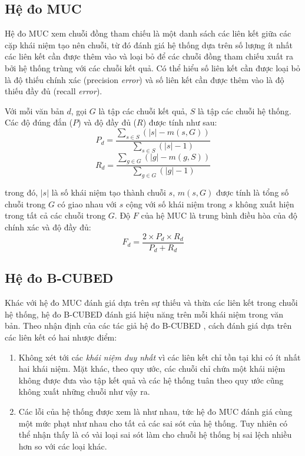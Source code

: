 \subsection*{Hệ đo MUC}
Hệ đo MUC \cite{MarcVilain1995} xem chuỗi đồng tham chiếu là một danh sách các liên kết giữa các cặp khái niệm tạo nên chuỗi, từ đó đánh giá hệ thống dựa trên số lượng ít nhất các liên kết cần được thêm vào và loại bỏ để các chuỗi đồng tham chiếu xuất ra bởi hệ thống trùng với các chuỗi kết quả. Có thể hiểu số liên kết cần được loại bỏ là độ thiếu chính xác (precision \emph{error}) và số liên kết cần được thêm vào là độ thiếu đầy đủ (recall \emph{error}). 

Với mỗi văn bản $d$, gọi $G$ là tập các chuỗi kết quả, $S$ là tập các chuỗi hệ thống. Các độ đúng đắn ($P$) và độ đầy đủ ($R$) được tính như sau:
\[P_d=\frac{\sum_{s\in S} \left(|s| - m(s, G)\right)}{\sum_{s\in S}\left(|s| - 1\right)}\]
\[R_d=\frac{\sum_{g\in G}(|g|-m(g,S))}{\sum_{g\in G}(|g|-1)}\]

\noindent trong đó, $|s|$ là số khái niệm tạo thành chuỗi $s$, $m(s,G)$ được tính là tổng số chuỗi trong $G$ có giao nhau với $s$ cộng với số khái niệm trong $s$ không xuất hiện trong tất cả các chuỗi trong $G$. Độ $F$ của hệ MUC là trung bình điều hòa của độ chính xác và độ đầy đủ:
\[F_d=\frac{2\times P_d\times R_d}{P_d + R_d}\]

\subsection*{Hệ đo B-CUBED}
Khác với hệ đo MUC đánh giá dựa trên sự thiếu và thừa các liên kết trong chuỗi hệ thống, hệ đo B-CUBED đánh giá hiệu năng trên mỗi khái niệm trong văn bản. Theo nhận định của các tác giả hệ đo B-CUBED \cite{AmitBagga1998}, cách đánh giá dựa trên các liên kết có hai nhược điểm:

\begin{enumerate}[leftmargin=\parindent]
\item Không xét tới các \emph{khái niệm duy nhất} vì các liên kết chỉ tồn tại khi có ít nhất hai khái niệm. Mặt khác, theo quy ước, các chuỗi chỉ chứa một khái niệm không được đưa vào tập kết quả và các hệ thống tuân theo quy ước cũng không xuất những chuỗi như vậy ra.

\item Các lỗi của hệ thống được xem là như nhau, tức hệ đo MUC đánh giá cùng một mức phạt như nhau cho tất cả các sai sót của hệ thống. Tuy nhiên có thể nhận thấy là có vài loại sai sót làm cho chuỗi hệ thống bị sai lệch nhiều hơn so với các loại khác.
\end{enumerate}

